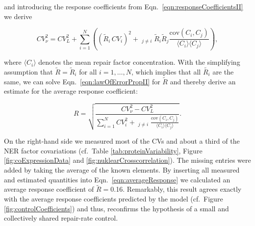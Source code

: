 and introducing the response coefficients from Eqn.\ \ref{eqn:responseCoefficientsII} we derive

\begin{equation}
	CV_{\nu}^2 = CV_{L}^2 + \sum_{i=1}^{N} \left((\tilde{R}_i\,CV_i)^2 + \mathop{\sum_{j = 1}^{N}}_{j\neq i} \tilde{R}_i\tilde{R}_j \frac{\textrm{cov}(C_i,C_j)}{\langle C_i \rangle\langle C_j\rangle}\right),
	\label{eqn:lawOfErrorPropII}
\end{equation}

where $\langle C_i \rangle$ denotes the mean repair factor concentration. With the simplifying assumption that $\tilde{R} = \tilde{R}_i$ for all $i = 1,\ldots,N$, which implies that all $\tilde{R_i}$ are the same, we can solve Eqn.\ \ref{eqn:lawOfErrorPropII} for $\tilde{R}$ and thereby derive an estimate for the average response coefficient:

\begin{equation}
	R = \sqrt{	\frac{CV_{\nu}^2 - CV_L^2}{\sum_{i=1}^{N} CV_i^2 + \mathop{\sum_{j=1}^{N}}_{j \neq i} \frac{\textrm{cov}(C_i,C_j)}{\langle C_i \rangle\langle C_j\rangle}}}.
	\label{eqn:averageResponse}
\end{equation} 


On the right-hand side we measured most of the CVs and about a third of the NER factor covariations (cf.\ Table \ref{tab:proteinVariability}, Figure \ref{fig:coExpressionData} and \ref{fig:nuklearCrosscorrelation}). The missing entries were added by taking the average of the known elements. By inserting all measured and estimated quantities into Eqn.\ \ref{eqn:averageResponse} we calculated an average response coefficient of $\tilde{R} =$0.16. Remarkably, this result agrees exactly with the average response coefficients predicted by the model (cf.\ Figure \ref{fig:controlCoefficients}) and thus, reconfirms the hypothesis of a small and collectively shared repair-rate control.     





